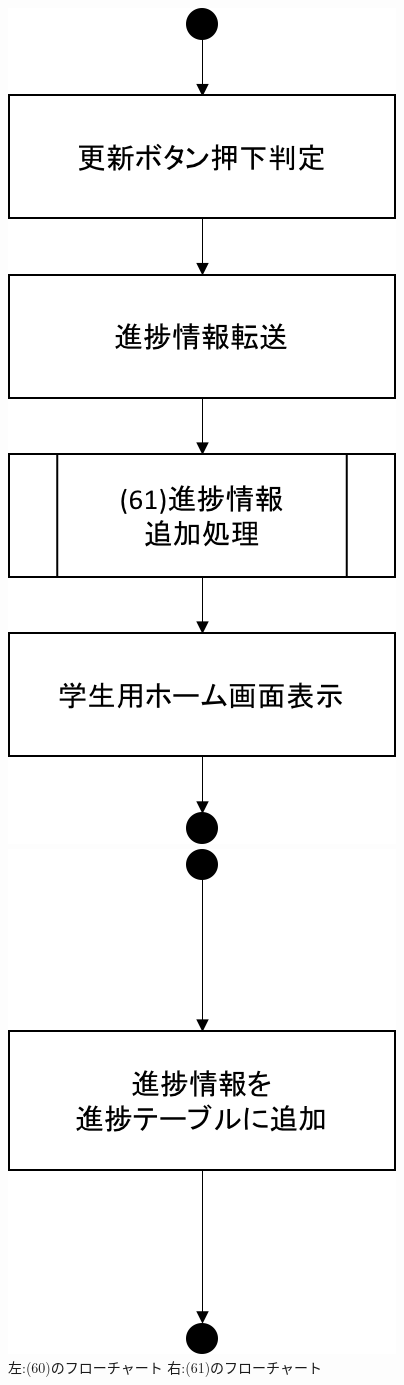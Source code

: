 \begin{figure}[htbp]
 \begin{minipage}{0.5\hsize}
  \begin{center}
   \includegraphics[width=0.5\linewidth,clip]{./img/flow/60.png}
  \end{center}
 \end{minipage}
 \begin{minipage}{0.5\hsize}
  \begin{center}
   \includegraphics[width=0.5\linewidth,clip]{./img/flow/61.png}
  \end{center}
 \end{minipage}
 \caption{左:(60)のフローチャート 右:(61)のフローチャート}\label{fig:60to61}
\end{figure}


